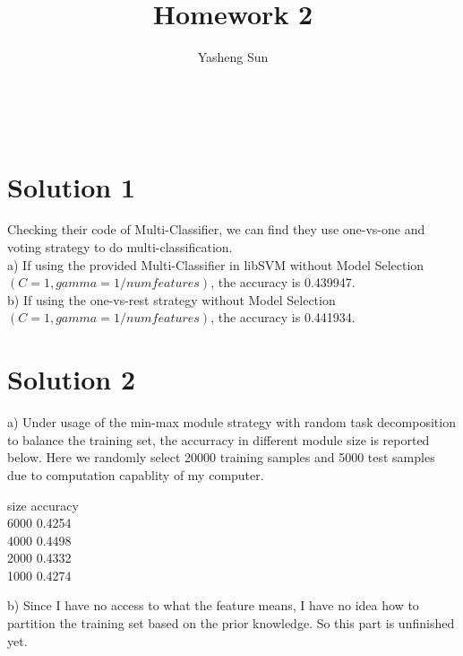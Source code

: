 \documentclass[12pt]{article}
\begin{document}
\title{Homework 2}
\author{Yasheng Sun}
\date{}

 \\
\section{Solution 1}
Checking their code of Multi-Classifier, we can find they use one-vs-one and voting strategy to do multi-classification.\\
a) If using the provided Multi-Classifier in libSVM without Model Selection$(C = 1, gamma = 1/numfeatures)$, the accuracy is 0.439947.\\
b) If using the one-vs-rest strategy without Model Selection$(C = 1, gamma = 1/numfeatures)$, the accuracy is 0.441934.\\
\section{Solution 2}
a)
Under usage of the min-max module strategy with random task decomposition to balance the training set, the accurracy in different module size is reported below. Here we randomly select 20000 training samples and 5000 test samples due to computation capablity of my computer.\\
\begin{center}
 size  accuracy\\
6000  0.4254\\
4000  0.4498\\
2000  0.4332\\
1000  0.4274\\
\end{center}
b) Since I have no access to what the feature means, I have no idea how to partition the training set based on the prior knowledge. So this part is unfinished yet.
\end{document}
